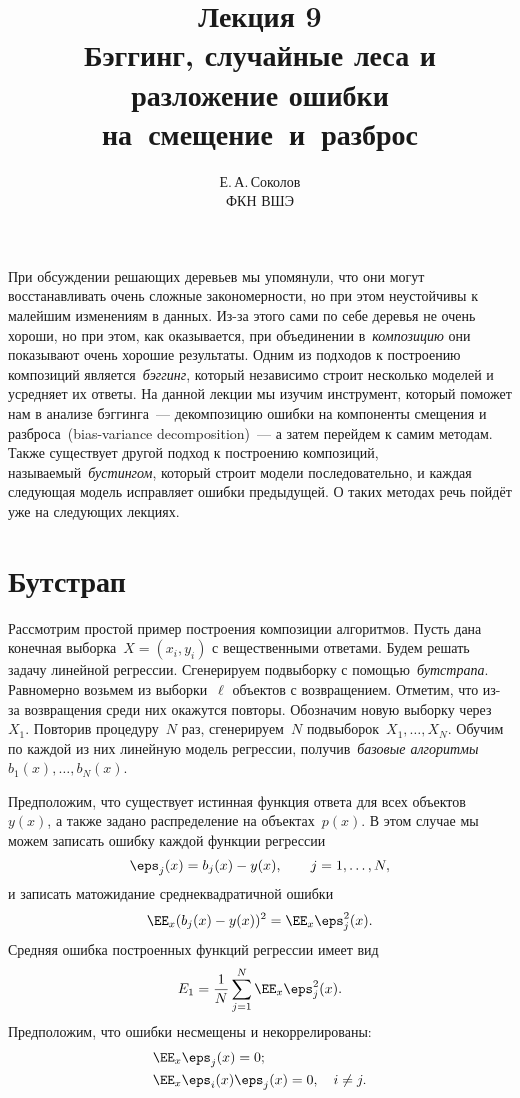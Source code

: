 \documentclass[12pt,fleqn]{article}
\begin{document}
\title{Лекция 9\\Бэггинг, случайные леса и разложение ошибки на~смещение~и~разброс}
\author{Е.\,А.\,Соколов\\ФКН ВШЭ}
\maketitle

При обсуждении решающих деревьев мы упомянули, что они могут
восстанавливать очень сложные закономерности,
но при этом неустойчивы к малейшим изменениям в данных.
Из-за этого сами по себе деревья не очень хороши,
но при этом, как оказывается, при объединении в~\emph{композицию}
они показывают очень хорошие результаты.
Одним из подходов к построению композиций является~\emph{бэггинг},
который независимо строит несколько моделей и усредняет их ответы.
На данной лекции мы изучим инструмент, который поможет нам в анализе бэггинга~---
декомпозицию ошибки на компоненты смещения и разброса~(bias-variance decomposition)~---
а затем перейдем к самим методам.
Также существует другой подход к построению композиций, называемый~\emph{бустингом},
который строит модели последовательно, и каждая следующая модель исправляет ошибки предыдущей.
О таких методах речь пойдёт уже на следующих лекциях.

\section{Бутстрап}
Рассмотрим простой пример построения композиции алгоритмов.
Пусть дана конечная выборка~$X = (x_i, y_i)$ с вещественными ответами.
Будем решать задачу линейной регрессии.
Сгенерируем подвыборку с помощью~\emph{бутстрапа}.
Равномерно возьмем из выборки~$\ell$ объектов с возвращением.
Отметим, что из-за возвращения среди них окажутся повторы.
Обозначим новую выборку через~$X_1$.
Повторив процедуру~$N$ раз, сгенерируем~$N$ подвыборок~$X_1, \dots, X_N$.
Обучим по каждой из них линейную модель регрессии,
получив~\emph{базовые алгоритмы}~$b_1(x), \dots, b_N(x)$.

Предположим, что существует истинная функция ответа для всех объектов~$y(x)$,
а также задано распределение на объектах~$p(x)$.
В этом случае мы можем записать ошибку каждой функции регрессии
\[
    \eps_j(x) = b_j(x) - y(x),
    \qquad
    j = 1, \dots, N,
\]
и записать матожидание среднеквадратичной ошибки
\[
    \EE_x (b_j(x) - y(x))^2
    =
    \EE_x \eps_j^2(x).
\]
Средняя ошибка построенных функций регрессии имеет вид
\[
    E_1
    =
    \frac{1}{N}
    \sum_{j = 1}^{N}
    \EE_x \eps_j^2(x).
\]
Предположим, что ошибки несмещены и некоррелированы:
\begin{align*}
    &\EE_x \eps_j(x) = 0;\\
    &\EE_x \eps_i(x) \eps_j(x) = 0,
    \quad
    i \neq j.
\end{align*}
\end{document}
